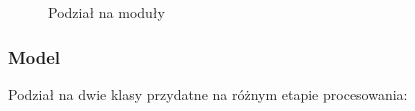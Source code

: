 \begin{figure}[!ht]
	\caption{\label{fig:flow_chart}Podział na moduły}
\end{figure}

\subsubsection{Model}

Podział na dwie klasy przydatne na różnym etapie procesowania:

